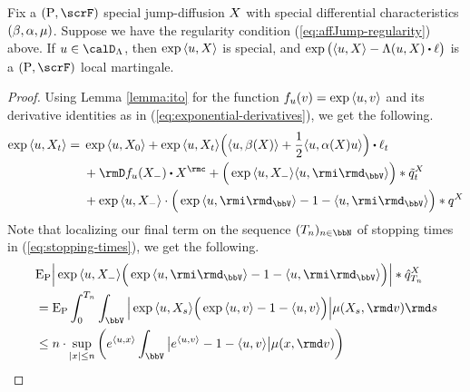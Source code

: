 \begin{proposition}
  \label{proposition:LK-real}
  Fix a $(\Prb, \scrF)$ special jump-diffusion $X$ with special differential characteristics $(\beta, \alpha, \mu)$.
  Suppose we have the regularity condition (\ref{eq:affJump-regularity}) above.
  If $\momentVar \in \odeSpace$, then $\exp{\langle u, X\rangle}$ is special, and $\exp\big( \prj\momentVar\X - \ode(\momentVar, \X) \shortInt \leb \big)$ is a $(\Prb, \scrF)$ local martingale.
\end{proposition}
\begin{proof}
  \label{proposition:LK-real}
  Using Lemma \ref{lemma:ito} for the function $f_u(v) = \exp{\langle u, v\rangle}$ and its derivative identities as in (\ref{eq:exponential-derivatives}), we get the following.
  \begin{equation}
    \label{eq:LK-ito-pause}
    \exp\prj{\momentVar}{\X_t}
    = \begin{aligned}[t]
      &\exp\prj{\momentVar}{\X_0} + \exp\prj{\momentVar}{\X_t} \Big( \prj{\momentVar}{\affDrift(\X)} + \frac12 \prj{\momentVar}{\affDiff(\X)\momentVar} \Big) \shortInt \leb_t \\
      &+ \Der f_\momentVar(\X_-) \shortInt \X^\rmc + \Big( \exp\prj{\momentVar}{\X_-} \prj{\momentVar}{\id_\vecSpace} \Big) \ast \compensate{\jumpMeas^\X}_t \\
      &+ \exp\prj{\momentVar}{\X_-} \cdot \Big( \exp\prj{\momentVar}{\id_\vecSpace} - 1 - \prj{\momentVar}{\id_\vecSpace} \Big) \ast \jumpMeas^\X
    \end{aligned}
  \end{equation}
  Note that localizing our final term on the sequence $(T_n)_{n\in\bbN}$ of stopping times in (\ref{eq:stopping-times}), we get the following.
  \begin{align*}
    &\Exp_\Prb  \Big| \exp\prj{\momentVar}{\X_-} \Big( \exp\prj{\momentVar}{\id_\vecSpace} - 1 - \prj{\momentVar}{\id_\vecSpace} \Big) \Big| \ast \predproj{\jumpMeas^\X}_{T_n} \\
    &= \Exp_\Prb \int_0^{T_n} \int_\vecSpace \Big| \exp\prj{\momentVar}{\X_s} \Big( \exp\prj{\momentVar}{\markVar} - 1 - \prj{\momentVar}{\markVar} \Big) \Big| \affJump(\X_s, \rmd\markVar) \rmd s \\
    &\leq n \cdot \sup_{|\stateVar|\leq n} \bigg( e^\prj\momentVar\stateVar \int_\vecSpace \big| e^\prj{\momentVar}{\markVar} - 1 - \prj{\momentVar}{\markVar} \big| \affJump(\stateVar, \rmd\markVar) \bigg)
  \end{align*}

\end{proof}
